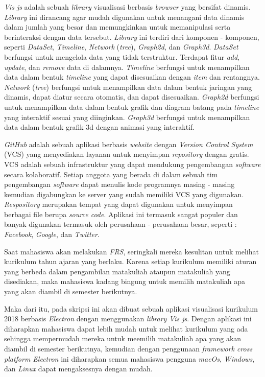  \textit{Vis js} adalah sebuah \textit{library} visualisasi berbasis \textit{browser} yang bersifat dinamis. \textit{Library} ini dirancang agar mudah digunakan untuk menangani data dinamis dalam jumlah yang besar dan memungkinkan untuk memanipulasi serta berinteraksi dengan data tersebut. \textit{Library} ini terdiri dari komponen - komponen, seperti \textit{DataSet}, \textit{Timeline}, \textit{Network} (\textit{tree}), \textit{Graph2d}, dan \textit{Graph3d}. \textit{DataSet} berfungsi untuk mengelola data yang tidak terstruktur. Terdapat fitur \textit{add}, \textit{update}, dan \textit{remove} data di dalamnya. \textit{Timeline} berfungsi untuk menampilkan data dalam bentuk \textit{timeline} yang dapat disesuaikan dengan \textit{item} dan rentangnya.  \textit{Network} (\textit{tree}) berfungsi untuk menampilkan data dalam bentuk jaringan yang dinamis, dapat diatur secara otomatis, dan dapat disesuaikan. \textit{Graph2d} berfungsi untuk menampilkan data dalam bentuk grafik dan diagram batang pada \textit{timeline} yang interaktif sesuai yang diinginkan. \textit{Graph3d} berfungsi untuk menampilkan data dalam bentuk grafik 3d dengan animasi yang interaktif. 

\textit{GitHub} adalah sebuah aplikasi berbasis \textit{website} dengan \textit{Version Control System} (VCS) yang menyediakan layanan untuk menyimpan \textit{repository} dengan gratis. VCS  adalah sebuah infrastruktur yang dapat mendukung pengembangan \textit{software} secara kolaboratif. Setiap anggota yang berada di dalam sebuah tim pengembangan \textit{software} dapat menulis kode programnya masing - masing kemudian digabungkan ke server yang sudah memiliki VCS yang digunakan. \textit{Respository} merupakan tempat yang dapat digunakan untuk menyimpan berbagai file berupa \textit{source code}. Aplikasi ini termasuk sangat populer dan banyak digunakan termasuk oleh perusahaan - perusahaan besar, seperti : \textit{Facebook}, \textit{Google}, dan \textit{Twitter}.

Saat mahasiswa akan melakukan \textit{FRS}, seringkali mereka kesulitan untuk melihat kurikulum tahun ajaran yang berlaku. Karena setiap kurikulum memiliki aturan yang berbeda dalam pengambilan matakuliah ataupun matakuliah yang disediakan, maka mahasiswa kadang bingung untuk memilih matakuliah apa yang akan diambil di semester berikutnya.

Maka dari itu, pada skripsi ini akan dibuat sebuah aplikasi visualisasi kurikulum 2018 berbasis \textit{Electron} dengan menggunakan \textit{library Vis js}. Dengan aplikasi ini diharapkan mahasiswa dapat lebih mudah untuk melihat kurikulum yang ada sehingga mempermudah mereka untuk meemilih matakuliah apa yang akan diambil di semester berikutnya, kemudian dengan penggunaan \textit{framework cross platform Electron} ini diharapkan semua mahasiswa pengguna \textit{macOs}, \textit{Windows}, dan \textit{Linux} dapat mengaksesnya dengan mudah.

